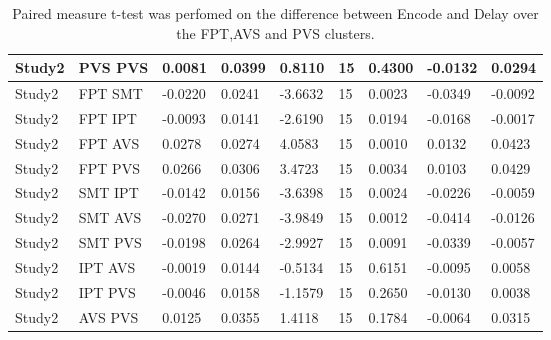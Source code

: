 \begin{table}[!hbt]
\begin{tabular}[0.2em]{@{}lllllllll@{}}
Study2 & PVS PVS & 0.0081 & 0.0399 & 0.8110 & 15 & 0.4300 & -0.0132 & 0.0294 \\\midrule
Study2 & FPT SMT & -0.0220 & 0.0241 & -3.6632 & 15 & 0.0023 & -0.0349 & -0.0092 \\\midrule
Study2 & FPT IPT & -0.0093 & 0.0141 & -2.6190 & 15 & 0.0194 & -0.0168 & -0.0017 \\\midrule
Study2 & FPT AVS & 0.0278 & 0.0274 & 4.0583 & 15 & 0.0010 & 0.0132 & 0.0423 \\\midrule
Study2 & FPT PVS & 0.0266 & 0.0306 & 3.4723 & 15 & 0.0034 & 0.0103 & 0.0429 \\\midrule
Study2 & SMT IPT & -0.0142 & 0.0156 & -3.6398 & 15 & 0.0024 & -0.0226 & -0.0059 \\\midrule
Study2 & SMT AVS & -0.0270 & 0.0271 & -3.9849 & 15 & 0.0012 & -0.0414 & -0.0126 \\\midrule
Study2 & SMT PVS & -0.0198 & 0.0264 & -2.9927 & 15 & 0.0091 & -0.0339 & -0.0057 \\\midrule
Study2 & IPT AVS & -0.0019 & 0.0144 & -0.5134 & 15 & 0.6151 & -0.0095 & 0.0058 \\\midrule
Study2 & IPT PVS & -0.0046 & 0.0158 & -1.1579 & 15 & 0.2650 & -0.0130 & 0.0038 \\\midrule
Study2 & AVS PVS & 0.0125 & 0.0355 & 1.4118 & 15 & 0.1784 & -0.0064 & 0.0315 \\\bottomrule[0.2em]
\end{tabular}
\caption{Paired measure t-test was perfomed on the difference between Encode and Delay over the FPT,AVS and PVS clusters.\label{tabel:GDEMFC}}
\end{table}
